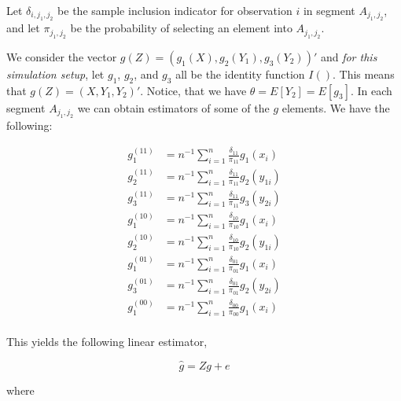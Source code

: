 \documentclass[
  letterpaper,
  DIV=11,
  numbers=noendperiod]{scrartcl}
\begin{document}
Let \(\delta_{i, j_1, j_2}\) be the sample inclusion indicator for
observation \(i\) in segment \(A_{j_1, j_2}\), and let
\(\pi_{j_1, j_2}\) be the probability of selecting an element into
\(A_{j_1, j_2}\).

We consider the vector \(g(Z) = (g_1(X), g_2(Y_1), g_3(Y_2))'\) and
\emph{for this simulation setup}, let \(g_1\), \(g_2\), and \(g_3\) all
be the identity function \(I()\). This means that
\(g(Z) = (X, Y_1, Y_2)'\). Notice, that we have
\(\theta = E[Y_2] = E[g_3]\). In each segment \(A_{j_1, j_2}\) we can
obtain estimators of some of the \(g\) elements. We have the following:

\begin{align*}
g_1^{(11)} &= n^{-1} \sum_{i = 1}^n \frac{\delta_{11}}{\pi_{11}} g_1(x_i) \\
g_2^{(11)} &= n^{-1} \sum_{i = 1}^n \frac{\delta_{11}}{\pi_{11}} g_2(y_{1i}) \\
g_3^{(11)} &= n^{-1} \sum_{i = 1}^n \frac{\delta_{11}}{\pi_{11}} g_3(y_{2i}) \\
g_1^{(10)} &= n^{-1} \sum_{i = 1}^n \frac{\delta_{10}}{\pi_{10}} g_1(x_i) \\
g_2^{(10)} &= n^{-1} \sum_{i = 1}^n \frac{\delta_{10}}{\pi_{10}} g_2(y_{1i}) \\
g_1^{(01)} &= n^{-1} \sum_{i = 1}^n \frac{\delta_{01}}{\pi_{01}} g_1(x_i) \\
g_3^{(01)} &= n^{-1} \sum_{i = 1}^n \frac{\delta_{01}}{\pi_{01}} g_2(y_{2i}) \\
g_1^{(00)} &= n^{-1} \sum_{i = 1}^n \frac{\delta_{00}}{\pi_{00}} g_1(x_i) \\
\end{align*}

This yields the following linear estimator,

\[ \hat g = Zg + e \]

where
\end{document}
